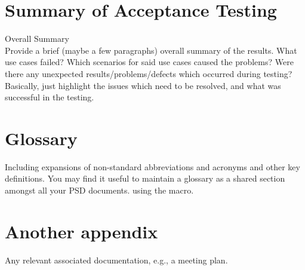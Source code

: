 \documentclass{l3deliverable}
\begin{document}

\section{Summary of Acceptance Testing}
Overall Summary \\
Provide a brief (maybe a few paragraphs) overall summary of the results. What use cases failed? Which scenarios for said use cases caused the problems? Were there any unexpected results/problems/defects which occurred during testing? Basically, just highlight the issues which need to be resolved, and what was successful in the testing. 

\appendix

\section{Glossary}

Including expansions of non-standard abbreviations and acronyms and
other key definitions.  You may find it useful to maintain a glossary
as a shared section amongst all your PSD documents. using the
\verb!! macro.

\section{Another appendix}

Any relevant associated documentation, e.g., a meeting plan.
\end{document}
